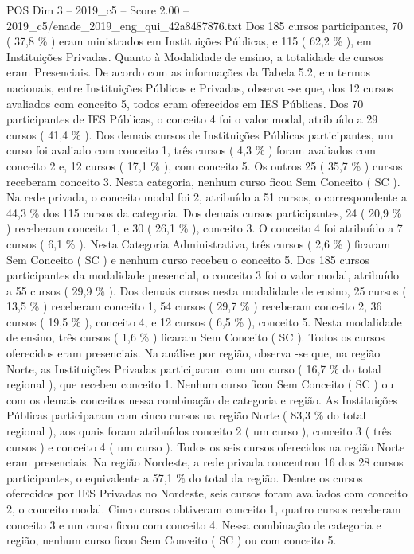 \begin{textsample}{POS Dim 3 – 2019\_c5 – Score 2.00 – 2019\_c5/enade\_2019\_eng\_qui\_42a8487876.txt}
Dos 185 cursos participantes, 70 ( 37,8 \% ) eram ministrados em Instituições Públicas, e 115 ( 62,2 \% ), em Instituições Privadas.
Quanto à Modalidade de ensino, a totalidade de cursos eram Presenciais.
De acordo com as informações da Tabela 5.2, em termos nacionais, entre Instituições Públicas e Privadas, observa -se que, dos 12 cursos avaliados com conceito 5, todos eram oferecidos em IES Públicas.
Dos 70 participantes de IES Públicas, o conceito 4 foi o valor modal, atribuído a 29 cursos ( 41,4 \% ).
Dos demais cursos de Instituições Públicas participantes, um curso foi avaliado com conceito 1, três cursos ( 4,3 \% ) foram avaliados com conceito 2 e, 12 cursos ( 17,1 \% ), com conceito 5.
Os outros 25 ( 35,7 \% ) cursos receberam conceito 3.
Nesta categoria, nenhum curso ficou Sem Conceito ( SC ).
Na rede privada, o conceito modal foi 2, atribuído a 51 cursos, o correspondente a 44,3 \% dos 115 cursos da categoria.
Dos demais cursos participantes, 24 ( 20,9 \% ) receberam conceito 1, e 30 ( 26,1 \% ), conceito 3.
O conceito 4 foi atribuído a 7 cursos ( 6,1 \% ).
Nesta Categoria Administrativa, três cursos ( 2,6 \% ) ficaram Sem Conceito ( SC ) e nenhum curso recebeu o conceito 5.
Dos 185 cursos participantes da modalidade presencial, o conceito 3 foi o valor modal, atribuído a 55 cursos ( 29,9 \% ).
Dos demais cursos nesta modalidade de ensino, 25 cursos ( 13,5 \% ) receberam conceito 1, 54 cursos ( 29,7 \% ) receberam conceito 2, 36 cursos ( 19,5 \% ), conceito 4, e 12 cursos ( 6,5 \% ), conceito 5.
Nesta modalidade de ensino, três cursos ( 1,6 \% ) ficaram Sem Conceito ( SC ).
Todos os cursos oferecidos eram presenciais.
Na análise por região, observa -se que, na região Norte, as Instituições Privadas participaram com um curso ( 16,7 \% do total regional ), que recebeu conceito 1.
Nenhum curso ficou Sem Conceito ( SC ) ou com os demais conceitos nessa combinação de categoria e região.
As Instituições Públicas participaram com cinco cursos na região Norte ( 83,3 \% do total regional ), aos quais foram atribuídos conceito 2 ( um curso ), conceito 3 ( três cursos ) e conceito 4 ( um curso ).
Todos os seis cursos oferecidos na região Norte eram presenciais.
Na região Nordeste, a rede privada concentrou 16 dos 28 cursos participantes, o equivalente a 57,1 \% do total da região.
Dentre os cursos oferecidos por IES Privadas no Nordeste, seis cursos foram avaliados com conceito 2, o conceito modal.
Cinco cursos obtiveram conceito 1, quatro cursos receberam conceito 3 e um curso ficou com conceito 4.
Nessa combinação de categoria e região, nenhum curso ficou Sem Conceito ( SC ) ou com conceito 5.

\end{textsample}
